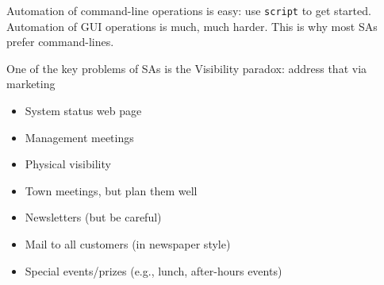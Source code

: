 \documentclass{slides}
\newcommand{\bi}{\begin{itemize}}
\newcommand{\ei}{\end{itemize}}
\begin{document}
Automation of command-line operations is easy: use {\tt script} to get 
started.  Automation of GUI operations is much, much harder.  This is why
most SAs prefer command-lines.


One of the key problems of SAs is the Visibility paradox:
address that via marketing

\bi
\item System status web page
\item Management meetings
\item Physical visibility
\item Town meetings, but plan them well
\item Newsletters (but be careful)
\item Mail to all customers (in newspaper style)
\item Special events/prizes (e.g., lunch, after-hours events)
\ei
\end{document}
